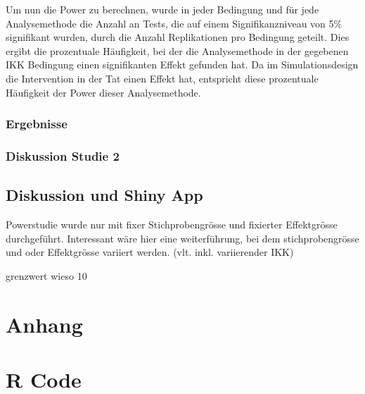 \documentclass[12pt]{article}\usepackage[]{graphicx}\usepackage[]{color}
\begin{document}
Um nun die Power zu berechnen, wurde in jeder Bedingung und für jede Analysemethode die Anzahl an Tests, die auf einem Signifikanzniveau von 5\% signifikant wurden, durch die Anzahl Replikationen pro Bedingung geteilt. Dies ergibt die prozentuale Häufigkeit, bei der die Analysemethode in der gegebenen IKK Bedingung einen signifikanten Effekt gefunden hat. Da im Simulationsdesign die Intervention in der Tat einen Effekt hat, entspricht diese prozentuale Häufigkeit der Power dieser Analysemethode.

\subsubsection{Ergebnisse}



















\subsubsection{Diskussion Studie 2}


\subsection{Diskussion und Shiny App}
Powerstudie wurde nur mit fixer Stichprobengrösse und fixierter Effektgrösse durchgeführt. Interessant wäre hier eine weiterführung, bei dem stichprobengrösse und oder Effektgrösse variiert werden. (vlt. inkl. variierender IKK)


grenzwert wieso 10%

\newpage
\singlespacing




\section{Anhang}
\appendix
\section{R Code}
\end{document}
